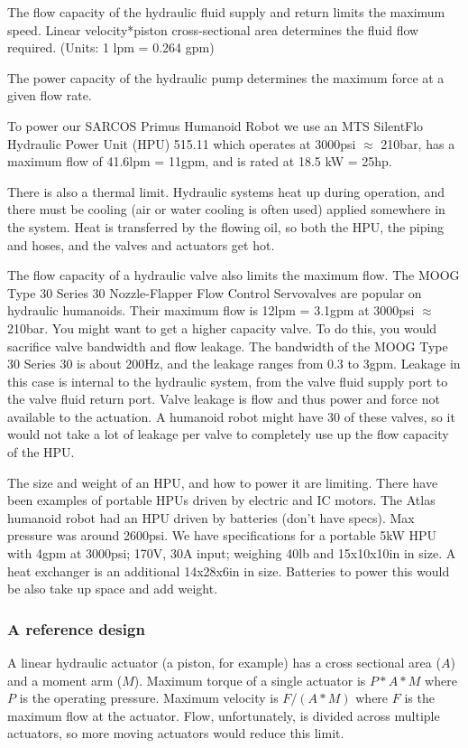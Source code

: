 \documentclass[letterpaper,12pt,fullpage]{article}
\begin{document}
The flow capacity of the hydraulic fluid supply and return limits
the maximum speed. Linear velocity*piston cross-sectional area determines 
the fluid flow required.
(Units: 1 lpm = 0.264 gpm)

The power capacity of the hydraulic pump determines the maximum force
at a given flow rate.

To power our SARCOS Primus Humanoid Robot we use an
MTS SilentFlo Hydraulic Power Unit (HPU) 515.11
which operates at 3000psi $\approx$ 210bar,
has a maximum flow of 41.6lpm = 11gpm, and is rated at
18.5 kW = 25hp.

There is also a thermal limit. Hydraulic systems heat up during operation,
and there must be cooling (air or water cooling is often used)
applied somewhere in the system. Heat is transferred by the flowing oil,
so both the HPU, the piping and hoses, and the valves and actuators get hot.

The flow capacity of a hydraulic valve also limits the maximum flow.
The MOOG Type 30 Series 30 Nozzle-Flapper Flow Control Servovalves
are popular on hydraulic humanoids. Their maximum flow is
12lpm = 3.1gpm at 3000psi $\approx$ 210bar.
You might want to get a higher capacity valve. To do this, you
would sacrifice valve bandwidth and flow leakage.
The bandwidth of the MOOG Type 30
Series 30 is about 200Hz, and the leakage ranges from
0.3 to 3gpm. Leakage in this case is internal to the hydraulic
system, from the valve fluid supply port to the valve fluid return port.
Valve leakage is flow and thus power and force
not available to the actuation.
A humanoid robot might have 30 of these valves,
so it would not take a lot of leakage per valve to completely
use up the flow capacity of the HPU.

The size and weight of an HPU, and how to power it are limiting.
There have been examples of portable HPUs driven by electric and IC motors.
The Atlas humanoid
robot had an HPU driven by batteries (don't have specs).
Max pressure was around 2600psi.
We have specifications for a portable 
5kW HPU with 4gpm at 3000psi; 170V, 30A input; weighing
40lb and 15x10x10in in size.
A heat exchanger is an additional 14x28x6in in size.
Batteries to power this would be also take up space and 
add weight.

\subsubsection{A reference design}

A linear hydraulic actuator (a piston, for example) has a cross sectional
area ($A$) and a moment arm ($M$). Maximum torque of a single actuator
is $P*A*M$ where $P$ is the operating pressure.
Maximum velocity is $F/(A*M)$ where $F$ is the maximum flow at the
actuator.
Flow, unfortunately, is divided across multiple actuators,
so more moving actuators would reduce this limit.
\end{document}
